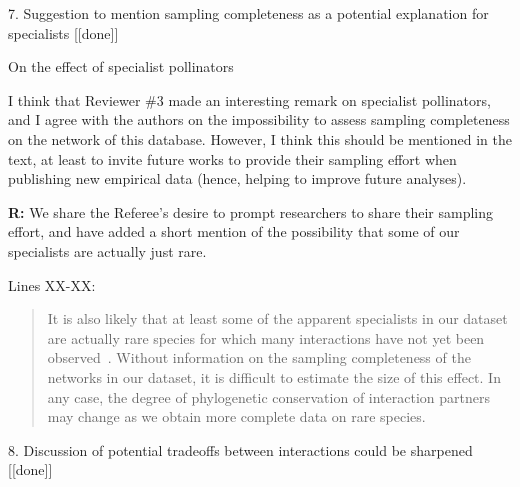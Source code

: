 \documentclass[12pt]{letter}
\newenvironment{refquote}{\bigskip \begin{it}}{\end{it}\smallskip}
\begin{document}
	7. Suggestion to mention sampling completeness as a potential explanation for specialists [[done]]

		\begin{refquote}
			On the effect of specialist pollinators

			I think that Reviewer \#3 made an interesting remark on specialist pollinators, and I agree with the authors on the impossibility to assess sampling completeness on the network of this database. However, I think this should be mentioned in the text, at least to invite future works to provide their sampling effort when publishing new empirical data (hence, helping to improve future analyses).
		\end{refquote}


		\textbf{R:} We share the Referee's desire to prompt researchers to share their sampling effort, and have added a short mention of the possibility  that some of our specialists are actually just rare.


		Lines XX-XX:

		\begin{quotation}

			It is also likely that at least some of the apparent specialists in our dataset are actually rare species for which many interactions have not yet been observed~\citep{Bluthgen2006,Poisot2015}. Without information on the sampling completeness of the networks in our dataset, it is difficult to estimate the size of this effect. In any case, the degree of phylogenetic conservation of interaction partners may change as we obtain more complete data on rare species.

		\end{quotation}


	8. Discussion of potential tradeoffs between interactions could be sharpened [[done]]
\end{document}
